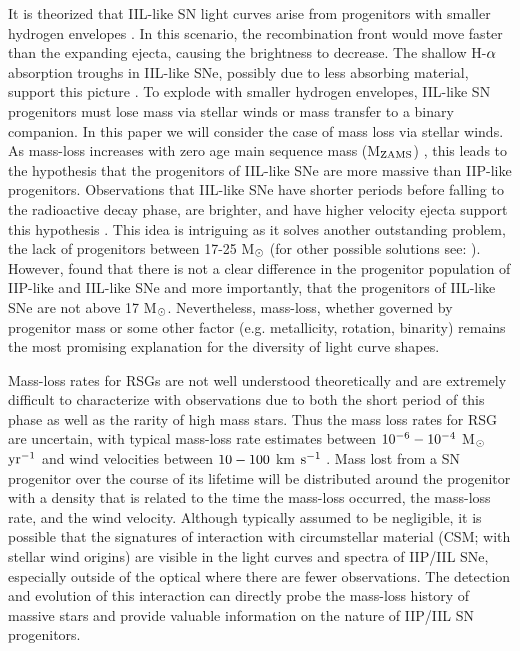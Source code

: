 \documentclass[a4paper,fleqn,usenatbib]{mnras}
\newcommand{\msun}{M$\rm{_{\odot}}$ }
\newcommand{\msunperiod}{M$\rm{_{\odot}}$}
\begin{document}
It is theorized that IIL-like SN light curves arise from progenitors with  smaller hydrogen envelopes \citep{1971grassberg,1989branch,1993blinnikov}.
In this scenario, the recombination front would move faster than the expanding ejecta, causing the brightness to decrease. 
The shallow H-$\rm{\alpha}$ absorption troughs in IIL-like SNe, possibly due to less absorbing material, support this picture \citep{1996schlegel,2014gutierrez}.
To explode with smaller hydrogen envelopes, IIL-like SN progenitors must lose mass via stellar winds or mass transfer to a binary companion.
In this paper we will consider the case of mass loss via stellar winds.
As mass-loss increases with zero age main sequence mass (M$\rm{_{ZAMS}}$)  \citep{2003heger,2009kasen}, this leads to the hypothesis that the progenitors of IIL-like SNe are more massive than IIP-like progenitors. 
Observations that IIL-like SNe have shorter periods before falling to the radioactive decay phase, are brighter, and have higher velocity ejecta support this hypothesis \citep{1994patat,2014gutierrez,2014anderson,2014faran,2015sanders,2015valenti,2016valenti}.
This idea is intriguing as it solves another outstanding problem, the lack of progenitors between 17-25 \msun \citep{2015smartt} (for other possible solutions see: \citealt{2018davies, 2012walmswell}).
However, \citet{2016valenti} found that there is not a clear difference in the progenitor population of IIP-like and IIL-like SNe and more importantly, that the progenitors of IIL-like SNe are not above 17 \msunperiod.
Nevertheless, mass-loss, whether governed by progenitor mass or some other factor (e.g. metallicity, rotation, binarity) remains the most promising explanation for the diversity of light curve shapes.

Mass-loss rates for RSGs are not well understood theoretically and are extremely difficult to characterize with observations due to both the short period of this phase as well as the rarity of high mass stars.
Thus the mass loss rates for RSG are uncertain, with typical mass-loss rate estimates between $\rm{10^{-6}-10^{-4}}$ \msunperiod $\rm{yr^{-1}}$ and wind velocities between $\rm{10-100}$ km $\rm{s^{-1}}$ \citep{2011mauron}.
Mass lost from a SN progenitor over the course of its lifetime will be distributed around the progenitor with a density that is related to the time the mass-loss occurred, the mass-loss rate, and the wind velocity.
Although typically assumed to be negligible, it is possible that the signatures of interaction with circumstellar material (CSM; with stellar wind origins) are visible in the light curves and spectra of IIP/IIL SNe, especially outside of the optical where there are fewer observations.
The detection and evolution of this interaction can directly probe the mass-loss history of massive stars and provide valuable information on the nature of IIP/IIL SN progenitors.
\end{document}
